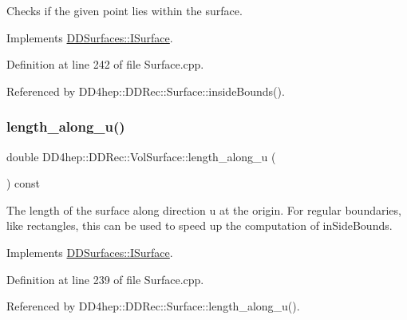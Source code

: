 Checks if the given point lies within the surface. 



Implements \hyperlink{class_d_d_surfaces_1_1_i_surface_a16aa78cb8c01cd5993b7cf23f55a7e3a}{D\+D\+Surfaces\+::\+I\+Surface}.



Definition at line 242 of file Surface.\+cpp.



Referenced by D\+D4hep\+::\+D\+D\+Rec\+::\+Surface\+::inside\+Bounds().

\hypertarget{class_d_d4hep_1_1_d_d_rec_1_1_vol_surface_ad36f7614fbe777044e50e5f5fa5997de}{}\label{class_d_d4hep_1_1_d_d_rec_1_1_vol_surface_ad36f7614fbe777044e50e5f5fa5997de} 
\subsubsection{\texorpdfstring{length\+\_\+along\+\_\+u()}{length\_along\_u()}}
{\footnotesize\ttfamily double D\+D4hep\+::\+D\+D\+Rec\+::\+Vol\+Surface\+::length\+\_\+along\+\_\+u (\begin{DoxyParamCaption}{ }\end{DoxyParamCaption}) const\hspace{0.3cm}{\ttfamily [virtual]}}

The length of the surface along direction u at the origin. For \textquotesingle{}regular\textquotesingle{} boundaries, like rectangles, this can be used to speed up the computation of in\+Side\+Bounds. 

Implements \hyperlink{class_d_d_surfaces_1_1_i_surface_a0060710912d3447e296a8e0875690cc9}{D\+D\+Surfaces\+::\+I\+Surface}.



Definition at line 239 of file Surface.\+cpp.



Referenced by D\+D4hep\+::\+D\+D\+Rec\+::\+Surface\+::length\+\_\+along\+\_\+u().

\hypertarget{class_d_d4hep_1_1_d_d_rec_1_1_vol_surface_aedd64d718c81b62fdad1094379190f81}{}\label{class_d_d4hep_1_1_d_d_rec_1_1_vol_surface_aedd64d718c81b62fdad1094379190f81} 
